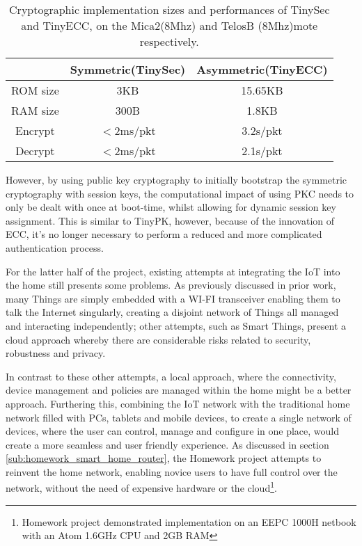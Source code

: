 \documentclass{mprop}
\begin{document}
\begin{table}[h] %
  \begin{center} 
  \begin{tabular}{|c|c|c|} 
  \hline
           & Symmetric(TinySec) & Asymmetric(TinyECC) \\ \hline
  ROM size & 3KB                & 15.65KB \\ \hline
  RAM size & 300B               & 1.8KB \\ \hline
  Encrypt  & $<$2ms/pkt         & 3.2s/pkt \\ \hline 
  Decrypt  & $<$2ms/pkt         & 2.1s/pkt \\ \hline
  \end{tabular}
  \caption[]{Cryptographic implementation sizes and performances of TinySec and TinyECC, on the Mica2(8Mhz) and TelosB (8Mhz)mote respectively\footnotemark. \cite{TinySec,TinyECC}}
  \label{tab:crypto_compare}
  \end{center}
\end{table}


However, by using public key cryptography to initially bootstrap the symmetric cryptography with session keys, the computational impact of using PKC needs to only be dealt with once at boot-time, whilst allowing for dynamic session key assignment. This is similar to TinyPK, however, because of the innovation of ECC, it's no longer necessary to perform a reduced and more complicated authentication process\cite{TinyPK}.


For the latter half of the project, existing attempts at integrating the IoT into the home still presents some problems. As previously discussed in prior work\cite{KNoT}, many Things are simply embedded with a WI-FI transceiver enabling them to talk the Internet singularly, creating a disjoint network of Things all managed and interacting independently; other attempts, such as Smart Things, present a cloud approach whereby there are considerable risks related to security, robustness and privacy. 

In contrast to these other attempts, a local approach, where the connectivity, device management and policies are managed within the home might be a better approach. Furthering this, combining the IoT network with the traditional home network filled with PCs, tablets and mobile devices, to create a single network of devices, where the user can control, manage and configure in one place, would create a more seamless and user friendly experience. As discussed in section \ref{sub:homework_smart_home_router}, the Homework project attempts to reinvent the home network, enabling novice users to have full control over the network, without the need of expensive hardware or the cloud\footnote{Homework project demonstrated implementation on an EEPC 1000H netbook with an Atom 1.6GHz CPU and 2GB RAM}. 
\end{document}
